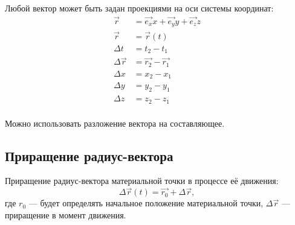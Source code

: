 \begin{figure}[!htbp]
  \begin{center}
  \end{center}
  \caption{}%
  \label{fig:radius-vector}
\end{figure}

Любой вектор может быть задан проекциями на оси системы координат:
\begin{align*}
  \vec{r}        & = \vec{e_x}x + \vec{e_y}y + \vec{e_z}z \\
  \vec{r}        & = \vec{r}(t)                           \\
  \Delta t       & = t_2 - t_1                            \\
  \Delta \vec{r} & = \vec{r_2} - \vec{r_1}                \\
  \Delta x       & = x_2 - x_1                            \\
  \Delta y       & = y_2 - y_1                            \\
  \Delta z       & = z_2 - z_1                            \\
\end{align*}

Можно использовать разложение вектора на составляющее.

\subsection{Приращение радиус-вектора}%

Приращение радиус-вектора материальной точки в процессе её движения: \[
  \Delta \vec{r}(t) = \vec{r_0} + \Delta \vec{r}
,\] где \( r_0 \) --- будет определять начальное положение материальной точки,
\( \Delta \vec{r} \) --- приращение в момент движения.

